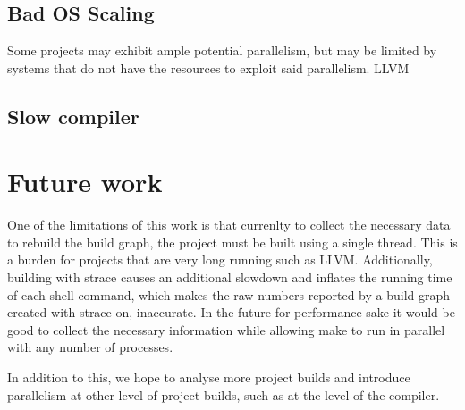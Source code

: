 \documentclass[twocolumn,sigplan,10pt,review]{acmart}
\begin{document}
\subsection{Bad OS Scaling}

Some projects may exhibit ample potential parallelism, but may be limited by systems that do not
have the resources to exploit said parallelism.  LLVM \cite{} 


\subsection{Slow compiler}

\section{Future work}

One of the limitations of this work is that currenlty to collect the necessary data to rebuild
the build graph, the project must be built using a single thread.  This is a burden for projects
that are very long running such as LLVM.  Additionally, building with strace causes an additional
slowdown and inflates the running time of each shell command, which makes the raw numbers
reported by a build graph created with strace on, inaccurate.  In the future for performance sake
it would be good to collect the necessary information while allowing make to run in parallel with
any number of processes.

In addition to this, we hope to analyse more project builds and introduce parallelism at other
level of project builds, such as at the level of the compiler.  
\end{document}
